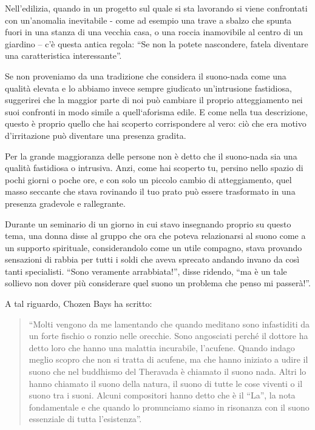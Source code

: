 Nell'edilizia, quando in un progetto sul quale si sta lavorando si
viene confrontati con un'anomalia inevitabile - come ad esempio una
trave a sbalzo che spunta fuori in una stanza di una vecchia casa, o una
roccia inamovibile al centro di un giardino -- c'è questa antica regola:
``Se non la potete nascondere, fatela diventare una caratteristica
interessante''.

Se non proveniamo da una tradizione che considera il suono-nada come una
qualità elevata e lo abbiamo invece sempre giudicato un'intrusione
fastidiosa, suggerirei che la maggior parte di noi può cambiare il
proprio atteggiamento nei suoi confronti in modo simile a quell`aforisma
edile. E come nella tua descrizione, questo è proprio quello che hai
scoperto corrispondere al vero: ciò che era motivo d'irritazione può
diventare una presenza gradita.

Per la grande maggioranza delle persone non è detto che il suono-nada
sia una qualità fastidiosa o intrusiva. Anzi, come hai scoperto tu,
persino nello spazio di pochi giorni o poche ore, e con solo un piccolo
cambio di atteggiamento, quel masso seccante che stava rovinando il tuo
prato può essere trasformato in una presenza gradevole e rallegrante.

Durante un seminario di un giorno in cui stavo insegnando proprio su
questo tema, una donna disse al gruppo che ora che poteva relazionarsi
al suono come a un supporto spirituale, considerandolo come un utile
compagno, stava provando sensazioni di rabbia per tutti i soldi che
aveva sprecato andando invano da così tanti specialisti. ``Sono
veramente arrabbiata!'', disse ridendo, ``ma è un tale sollievo non
dover più considerare quel suono un problema che penso mi passerà!''.

A tal riguardo, Chozen Bays ha scritto:

\begin{quotation}
``Molti vengono da me lamentando che quando meditano sono infastiditi da
un forte fischio o ronzio nelle orecchie. Sono angosciati perché il
dottore ha detto loro che hanno una malattia incurabile, l'acufene.
Quando indago meglio scopro che non si tratta di acufene, ma che hanno
iniziato a udire il suono che nel buddhismo del Theravada è chiamato il
suono nada. Altri lo hanno chiamato il suono della natura, il suono di
tutte le cose viventi o il suono tra i suoni. Alcuni compositori hanno
detto che è il ``La'', la nota fondamentale e che quando lo pronunciamo
siamo in risonanza con il suono essenziale di tutta l'esistenza''.\cite{deep}
\end{quotation}

